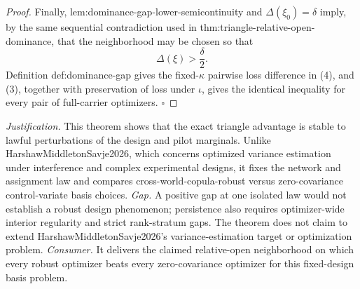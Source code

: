 \documentclass{article}
\begin{document}
\begin{proof}
Finally, lem:dominance-gap-lower-semicontinuity and \(\Delta(\xi_0)=\delta\) imply, by the same sequential contradiction used in thm:triangle-relative-open-dominance, that the neighborhood may be chosen so that
\[
\Delta(\xi)>\frac\delta2.
\tag{4}
\]
Definition def:dominance-gap gives the fixed-\(\kappa\) pairwise loss difference in (4), and (3), together with preservation of loss under \(\iota\), gives the identical inequality for every pair of full-carrier optimizers.  \(\square\)
\end{proof}
\par\smallskip\noindent \textit{Justification.} This theorem shows that the exact triangle advantage is stable to lawful perturbations of the design and pilot marginals.  Unlike HarshawMiddletonSavje2026, which concerns optimized variance estimation under interference and complex experimental designs, it fixes the network and assignment law and compares cross-world-copula-robust versus zero-covariance control-variate basis choices. \textit{Gap.} A positive gap at one isolated law would not establish a robust design phenomenon; persistence also requires optimizer-wide interior regularity and strict rank-stratum gaps.  The theorem does not claim to extend HarshawMiddletonSavje2026's variance-estimation target or optimization problem. \textit{Consumer.} It delivers the claimed relative-open neighborhood on which every robust optimizer beats every zero-covariance optimizer for this fixed-design basis problem.
\end{document}
